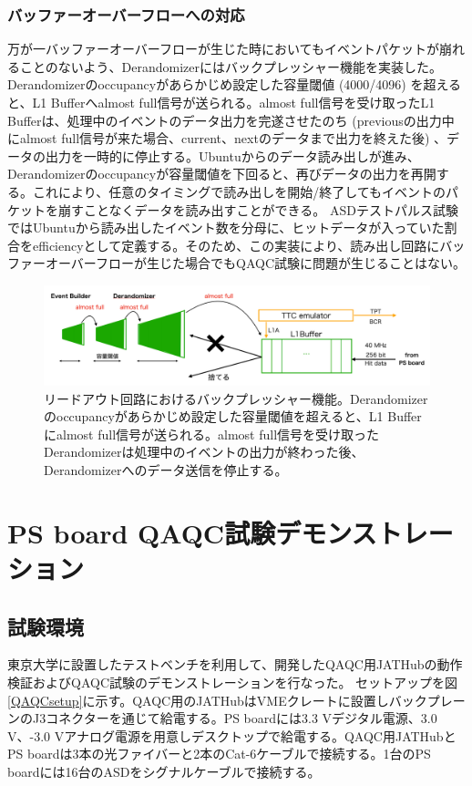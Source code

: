 \subsubsection{バッファーオーバーフローへの対応} \par
万が一バッファーオーバーフローが生じた時においてもイベントパケットが崩れることのないよう、Derandomizerにはバックプレッシャー機能を実装した。Derandomizerのoccupancyがあらかじめ設定した容量閾値 (4000/4096) を超えると、L1 Bufferへalmost full信号が送られる。almost full信号を受け取ったL1 Bufferは、処理中のイベントのデータ出力を完遂させたのち (previousの出力中にalmost full信号が来た場合、current、nextのデータまで出力を終えた後) 、データの出力を一時的に停止する。Ubuntuからのデータ読み出しが進み、Derandomizerのoccupancyが容量閾値を下回ると、再びデータの出力を再開する。これにより、任意のタイミングで読み出しを開始/終了してもイベントのパケットを崩すことなくデータを読み出すことができる。
ASDテストパルス試験ではUbuntuから読み出したイベント数を分母に、ヒットデータが入っていた割合をefficiencyとして定義する。そのため、この実装により、読み出し回路にバッファーオーバーフローが生じた場合でもQAQC試験に問題が生じることはない。
\baselineskip

\begin{figure} 
\centering
\includegraphics[width=16cm]{fig/QAQC/JATHubbackpressure.png}
\caption[リードアウト回路におけるバックプレッシャー機能]{リードアウト回路におけるバックプレッシャー機能。Derandomizerのoccupancyがあらかじめ設定した容量閾値を超えると、L1 Bufferにalmost full信号が送られる。almost full信号を受け取ったDerandomizerは処理中のイベントの出力が終わった後、Derandomizerへのデータ送信を停止する。}
\label{JATHubbackpressure}
\end{figure}

\section{PS board QAQC試験デモンストレーション}
\label{sec_PSboardQAQCdemo}

\subsection{試験環境}
\label{subsec_testenv}
東京大学に設置したテストベンチを利用して、開発したQAQC用JATHubの動作検証およびQAQC試験のデモンストレーションを行なった。
セットアップを図\ref{QAQCsetup}に示す。QAQC用のJATHubはVMEクレートに設置しバックプレーンのJ3コネクターを通じて給電する。PS boardには3.3 Vデジタル電源、3.0 V、-3.0 Vアナログ電源を用意しデスクトップで給電する。QAQC用JATHubとPS boardは3本の光ファイバーと2本のCat-6ケーブルで接続する。1台のPS boardには16台のASDをシグナルケーブルで接続する。

